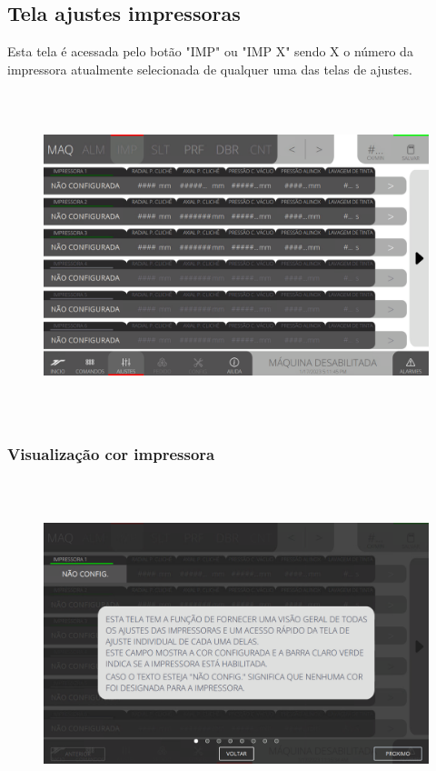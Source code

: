 \thispagestyle{fancy}
\vspace*{\fill}
\subsection{Tela ajustes impressoras}
Esta tela é acessada pelo botão "IMP" ou "IMP X" sendo X o número da impressora atualmente selecionada de qualquer uma das telas de ajustes.
\begin{figure}[h]
  \centering
  \includegraphics[width=576px,height=360px]{src/imagesFlexo/04-printter/01-printters/settings/e-Tela-Principal.png}
\end{figure}

\newpage
\thispagestyle{fancy}
\vspace*{\fill}
\subsubsection{\small{Visualização cor impressora}}
\begin{figure}[h]
  \centering
  \includegraphics[width=576px,height=360px]{src/imagesFlexo/04-printter/01-printters/settings/e-1.png}
\end{figure}
\vspace*{\fill}

